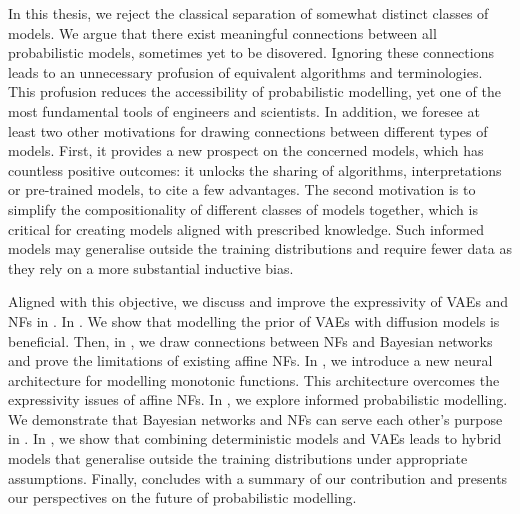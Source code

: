  In this thesis, we reject the classical separation of somewhat distinct classes of models. We argue that there exist meaningful connections between all probabilistic models, sometimes yet to be disovered. Ignoring these connections leads to an unnecessary profusion of equivalent algorithms and terminologies. This profusion reduces the accessibility of probabilistic modelling, yet one of the most fundamental tools of engineers and scientists. In addition, we foresee at least two other motivations for drawing connections between different types of models. First, it provides a new prospect on the concerned models, which has countless positive outcomes: it unlocks the sharing of algorithms, interpretations or pre-trained models, to cite a few advantages. The second motivation is to simplify the compositionality of different classes of models together, which is critical for creating models aligned with prescribed knowledge. Such informed models may generalise outside the training distributions and require fewer data as they rely on a more substantial inductive bias.

 Aligned with this objective, we discuss and improve the expressivity of VAEs and NFs in . In . We show that modelling the prior of VAEs with diffusion models is beneficial. Then, in , we draw connections between NFs and Bayesian networks and prove the limitations of existing affine NFs. In , we introduce a new neural architecture for modelling monotonic functions. This architecture overcomes the expressivity issues of affine NFs. In , we explore informed probabilistic modelling. We demonstrate that Bayesian networks and NFs can serve each other's purpose in . In , we show that combining deterministic models and VAEs leads to hybrid models that generalise outside the training distributions under appropriate assumptions. Finally,  concludes with a summary of our contribution and presents our perspectives on the future of probabilistic modelling.

%
%
